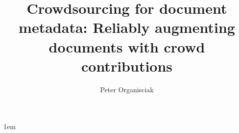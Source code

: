 \documentclass[draftthesis,tocnosub,noragright,centerchapter,12pt]{uiucecethesis09}
\title{Crowdsourcing for document metadata: Reliably augmenting documents with crowd contributions}
\author{Peter Organisciak}
\begin{document}
%

%
\maketitle

\parindent 1em%

\frontmatter

%


%

%
%

%
\tableofcontents

%

%

%
\end{document}
